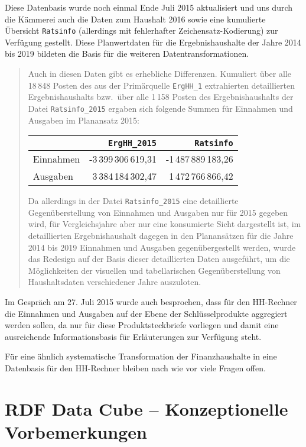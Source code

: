 \documentclass[a4paper,11pt,twoside]{article}
\begin{document}
Diese Datenbasis wurde noch einmal Ende Juli 2015 aktualisiert und uns durch
die Kämmerei auch die Daten zum Haushalt 2016 sowie eine kumulierte Übersicht
\texttt{Ratsinfo} (allerdings mit fehlerhafter Zeichensatz-Kodierung) zur
Verfügung gestellt.  Diese Planwertdaten für die Ergebnishaushalte der
Jahre 2014 bis 2019 bildeten die Basis für die weiteren Datentransformationen. 
\begin{quote}
  Auch in diesen Daten gibt es erhebliche Differenzen.  Kumuliert über alle
  18\,848 Posten des aus der Primärquelle \texttt{ErgHH\_1} extrahierten
  detaillierten Ergebnishaushalts bzw.\ über alle 1\,158 Posten des
  Ergebnishaushalts der Datei \texttt{Ratsinfo\_2015} ergaben sich folgende
  Summen für Einnahmen und Ausgaben im Planansatz 2015:
  \begin{center}
    \begin{tabular}{l|r|r}
      & \texttt{ErgHH\_2015}& \texttt{Ratsinfo}\\\hline
      Einnahmen & -3\,399\,306\,619,31 & -1\,487\,889\,183,26 \\
      Ausgaben & 3\,384\,184\,302,47 & 1\,472\,766\,866,42
    \end{tabular}
  \end{center}
Da allerdings in der Datei \texttt{Ratsinfo\_2015} eine detaillierte
Gegenüberstellung von Einnahmen und Ausgaben nur für 2015 gegeben wird, für
Vergleichsjahre aber nur eine konsumierte Sicht dargestellt ist, im
detaillierten Ergebnishaushalt dagegen in den Planansätzen für die Jahre 2014
bis 2019 Einnahmen und Ausgaben gegenübergestellt werden, wurde das Redesign
auf der Basis dieser detaillierten Daten ausgeführt, um die Möglichkeiten der
visuellen und tabellarischen Gegenüberstellung von Haushaltsdaten verschiedener
Jahre auszuloten.
\end{quote}
Im Gespräch am 27. Juli 2015 wurde auch besprochen, dass für den HH-Rechner die
Einnahmen und Ausgaben auf der Ebene der Schlüsselprodukte aggregiert werden
sollen, da nur für diese Produktsteckbriefe vorliegen und damit eine
ausreichende Informationsbasis für Erläuterungen zur Verfügung steht.  

Für eine ähnlich systematische Transformation der Finanzhaushalte in eine
Datenbasis für den HH-Rechner bleiben nach wie vor viele Fragen offen.

\section{RDF Data Cube -- Konzeptionelle Vorbemerkungen}
\end{document}
